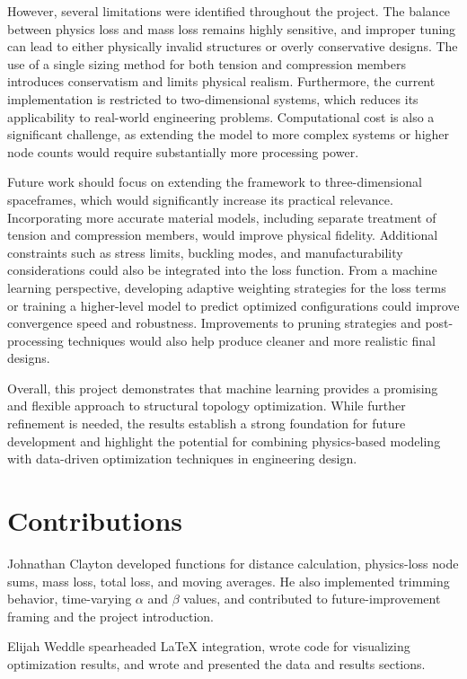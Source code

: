 \documentclass[11pt]{article}
\begin{document}
However, several limitations were identified throughout the project. The balance between physics loss and mass loss remains highly sensitive, and improper tuning can lead to either physically invalid structures or overly conservative designs. The use of a single sizing method for both tension and compression members introduces conservatism and limits physical realism. Furthermore, the current implementation is restricted to two-dimensional systems, which reduces its applicability to real-world engineering problems. Computational cost is also a significant challenge, as extending the model to more complex systems or higher node counts would require substantially more processing power.

Future work should focus on extending the framework to three-dimensional spaceframes, which would significantly increase its practical relevance. Incorporating more accurate material models, including separate treatment of tension and compression members, would improve physical fidelity. Additional constraints such as stress limits, buckling modes, and manufacturability considerations could also be integrated into the loss function. From a machine learning perspective, developing adaptive weighting strategies for the loss terms or training a higher-level model to predict optimized configurations could improve convergence speed and robustness. Improvements to pruning strategies and post-processing techniques would also help produce cleaner and more realistic final designs.

Overall, this project demonstrates that machine learning provides a promising and flexible approach to structural topology optimization. While further refinement is needed, the results establish a strong foundation for future development and highlight the potential for combining physics-based modeling with data-driven optimization techniques in engineering design.

\section*{Contributions}

Johnathan Clayton developed functions for distance calculation, physics-loss node sums, mass loss, total loss, and moving averages. He also implemented trimming behavior, time-varying $\alpha$ and $\beta$ values, and contributed to future-improvement framing and the project introduction.

Elijah Weddle spearheaded LaTeX integration, wrote code for visualizing optimization results, and wrote and presented the data and results sections.
\end{document}

